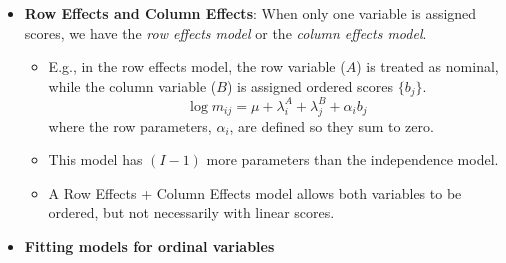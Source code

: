 \begin{frame}[allowframebreaks]
\begin{itemize}
\framebreak
	\item{\large\bfseries Row Effects and Column Effects}:
	  When only one variable is assigned scores, we have the \emph{row effects model}
	  or the \emph{column effects model}.
	  	\begin{itemize}
		\item E.g., in the row effects model, the row variable ($A$) is treated as nominal,
	  while the column variable ($B$) is assigned ordered scores $\{ b_j \}$.
	  \[ \log  m_{ij} = \mu + \lambda_i^A + \lambda_j^B  + \alpha_i b_j \]
	  where the row parameters, $\alpha_i$, are defined so they sum to zero.
	  	\item This model has $(I-1)$ more parameters than the independence model.
		\item A Row Effects + Column Effects model allows both variables to be ordered,
		but not necessarily with linear scores.
		\end{itemize} 
	\item{\large\bfseries Fitting models for ordinal variables}
	
  \end{itemize}
\end{frame}

